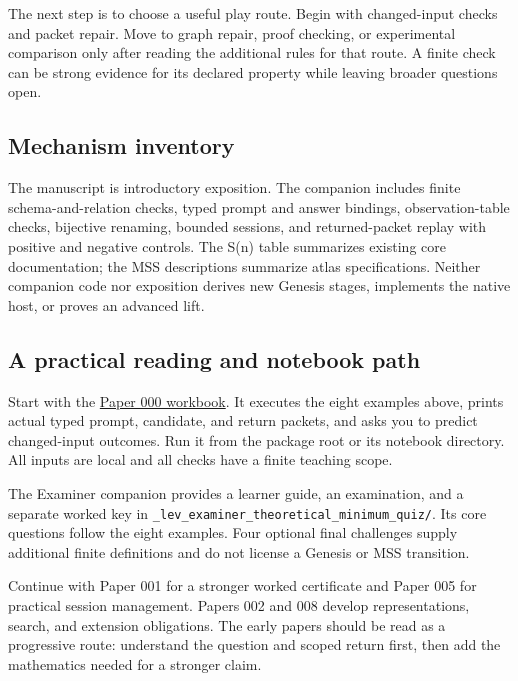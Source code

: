 \documentclass[
  11pt,
]{article}
\begin{document}
The next step is to choose a useful play route. Begin with changed-input
checks and packet repair. Move to graph repair, proof checking, or
experimental comparison only after reading the additional rules for that
route. A finite check can be strong evidence for its declared property
while leaving broader questions open.

\subsection{Mechanism inventory}\label{mechanism-inventory}

The manuscript is introductory exposition. The companion includes finite
schema-and-relation checks, typed prompt and answer bindings,
observation-table checks, bijective renaming, bounded sessions, and
returned-packet replay with positive and negative controls. The S(n)
table summarizes existing core documentation; the MSS descriptions
summarize atlas specifications. Neither companion code nor exposition
derives new Genesis stages, implements the native host, or proves an
advanced lift.

\subsection{A practical reading and notebook
path}\label{a-practical-reading-and-notebook-path}

Start with the
\href{https://github.com/dbccpage/the_symbol_game/blob/main/education/documentation/030_pfp_proposal_fidelity_protocol_pfp/papers/symbol_game/000_pfp_introduction/jupyter_notebooks/000_from_marks_to_returned_packets.ipynb}{Paper
000 workbook}. It executes the eight examples above, prints actual typed
prompt, candidate, and return packets, and asks you to predict
changed-input outcomes. Run it from the package root or its notebook
directory. All inputs are local and all checks have a finite teaching
scope.

The Examiner companion provides a learner guide, an examination, and a
separate worked key in
\nolinkurl{_lev_examiner_theoretical_minimum_quiz/}. Its core questions
follow the eight examples. Four optional final challenges supply
additional finite definitions and do not license a Genesis or MSS
transition.

Continue with Paper 001 for a stronger worked certificate and Paper 005
for practical session management. Papers 002 and 008 develop
representations, search, and extension obligations. The early papers
should be read as a progressive route: understand the question and
scoped return first, then add the mathematics needed for a stronger
claim.
\end{document}
